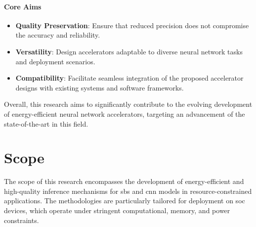 \paragraph{Core Aims}
\begin{itemize}
	\item \textbf{Quality Preservation}: Ensure that reduced precision does not compromise the accuracy and reliability.
	\item \textbf{Versatility}: Design accelerators adaptable to diverse neural network tasks and deployment scenarios.
	\item \textbf{Compatibility}: Facilitate seamless integration of the proposed accelerator designs with existing systems and software frameworks.
\end{itemize}

Overall, this research aims to significantly contribute to the evolving development of energy-efficient neural network accelerators, targeting an advancement of the state-of-the-art in this field.

\section{Scope}\label{chap1.scope}

The scope of this research encompasses the development of energy-efficient and high-quality inference mechanisms for \gls{sbs} and \gls{cnn} models in resource-constrained applications. The methodologies are particularly tailored for deployment on \gls{soc} devices, which operate under stringent computational, memory, and power constraints.

